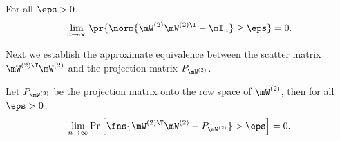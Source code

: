 \begin{corollary}
\label{cor:WW-Identity}
For all $\eps>0$,
\begin{equation}
    \lim_{n\to\infty}\pr{\norm{\mW^{(2)}\mW^{(2)\T}-\mI_n}\geq\eps}=0.
\end{equation}
\end{corollary}

Next we establish the approximate equivalence between the scatter matrix $\mW^{(2)\T}\mW^{(2)}$ and the projection matrix $P_{\mW^{(2)}}$.
\begin{lemma}
\label{lemma:W-projection}
Let $P_{\mW^{(2)}}$ be the projection matrix onto the row space of $\mW^{(2)}$, then for all $\eps>0$,
\begin{equation}
    \lim_{n\to\infty}\Pr\left[\fns{\mW^{(2)\T}\mW^{(2)}-P_{\mW^{(2)}}}>\eps\right]=0.
\end{equation}
\end{lemma}
